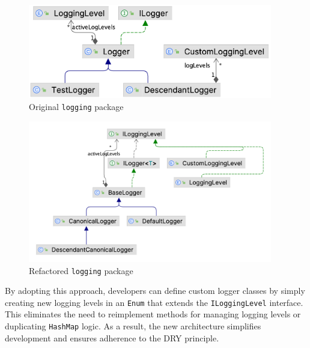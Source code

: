 \begin{minipage}{0.4\linewidth}
	\begin{figure}[H]
		\begin{center}
			\includegraphics[width=0.95\textwidth]{figures/logging_package/original.png}
			\caption{Original \texttt{logging} package}
			\label{fig:original_logging}
		\end{center}
	\end{figure}
\end{minipage}
\begin{minipage}{0.6\linewidth}
	\begin{figure}[H]
		\begin{center}
			\includegraphics[width=0.95\textwidth]{figures/logging_package/refactored.png}
			\caption{Refactored \texttt{logging} package}
			\label{fig:refactored_logging}
		\end{center}
	\end{figure}
\end{minipage}

\noindent By adopting this approach, developers can define custom logger classes by simply creating new logging levels in an \texttt{Enum} that extends the \texttt{ILoggingLevel} interface. This eliminates the need to reimplement methods for managing logging levels or duplicating \texttt{HashMap} logic. As a result, the new architecture simplifies development and ensures adherence to the DRY principle.

